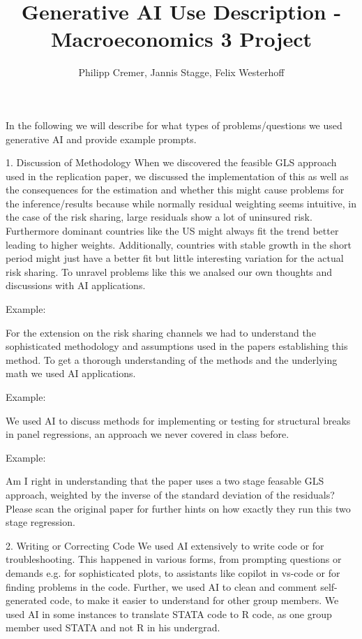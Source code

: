 \documentclass{article}
\title{Generative AI Use Description - Macroeconomics 3 Project}
\author{Philipp Cremer, Jannis Stagge, Felix Westerhoff}
\begin{document}
\maketitle

In the following we will describe for what types of problems/questions we used generative AI and provide example prompts.

1. Discussion of Methodology
    When we discovered the feasible GLS approach used in the replication paper, we discussed the implementation of this as well as the 
    consequences for the estimation and whether this might cause problems for the inference/results because while normally residual weighting
    seems intuitive, in the case of the risk sharing, large residuals show a lot of uninsured risk. Furthermore dominant countries like the US might always
    fit the trend better leading to higher weights. Additionally, countries with stable growth in the short period might just have a better fit but 
    little interesting variation for the actual risk sharing.
    To unravel problems like this we analsed our own thoughts and discussions with AI applications.

    Example:

    For the extension on the risk sharing channels we had to understand the sophisticated methodology and assumptions used in the papers establishing this method.
    To get a thorough understanding of the methods and the underlying math we used AI applications.

    Example:

    We used AI to discuss methods for implementing or testing for structural breaks in panel regressions, an approach we never covered in class before.

    Example:

    Am I right in understanding that the paper uses a two stage feasable GLS approach, weighted by the inverse of the standard deviation of the residuals? Please scan the original
    paper for further hints on how exactly they run this two stage regression.

2. Writing or Correcting Code
    We used AI extensively to write code or for troubleshooting. This happened in various forms, from prompting questions or demands e.g. for sophisticated plots,
    to assistants like copilot in vs-code or for finding problems in the code. Further, we used AI to clean and comment self-generated code, to make it easier to understand 
    for other group members. We used AI in some instances to translate STATA code to R code, as one group member used STATA and not R in his undergrad.
    
\end{document}
